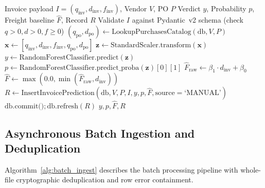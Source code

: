 \documentclass[conference]{IEEEtran}
\begin{document}
\begin{algorithm}[t]
\caption{VIPS Single Invoice Audit Pipeline}
\label{alg:single_invoice}
\begin{algorithmic}[1]
\REQUIRE Invoice payload $I = (q_{\text{inv}}, d_{\text{inv}}, f_{\text{inv}})$, Vendor $V$, PO $P$
\ENSURE Verdict $y$, Probability $p$, Freight baseline $\hat{F}$, Record $R$
\STATE Validate $I$ against Pydantic~v2 schema (check $q>0, d>0, f\ge 0$)
\STATE $(q_{\text{po}}, d_{\text{po}}) \leftarrow \text{LookupPurchasesCatalog}(\text{db}, V, P)$
\STATE $\mathbf{x} \leftarrow [q_{\text{inv}}, d_{\text{inv}}, f_{\text{inv}}, q_{\text{po}}, d_{\text{po}}]$
\STATE $\mathbf{z} \leftarrow \text{StandardScaler.transform}(\mathbf{x})$
\STATE $y \leftarrow \text{RandomForestClassifier.predict}(\mathbf{z})$
\STATE $p \leftarrow \text{RandomForestClassifier.predict\_proba}(\mathbf{z})[0][1]$
\STATE $\hat{F}_{\text{raw}} \leftarrow \beta_1 \cdot d_{\text{inv}} + \beta_0$
\STATE $\hat{F} \leftarrow \max(0.0, \min(\hat{F}_{\text{raw}}, d_{\text{inv}}))$
\STATE $R \leftarrow \text{InsertInvoicePrediction}(\text{db}, V, P, I, y, p, \hat{F}, \text{source}=\text{`MANUAL'})$
\STATE $\text{db.commit()}; \text{db.refresh}(R)$
\RETURN $y, p, \hat{F}, R$
\end{algorithmic}
\end{algorithm}

\subsection{Asynchronous Batch Ingestion and Deduplication}
Algorithm~\ref{alg:batch_ingest} describes the batch processing pipeline with whole-file cryptographic deduplication and row error containment.
\end{document}
